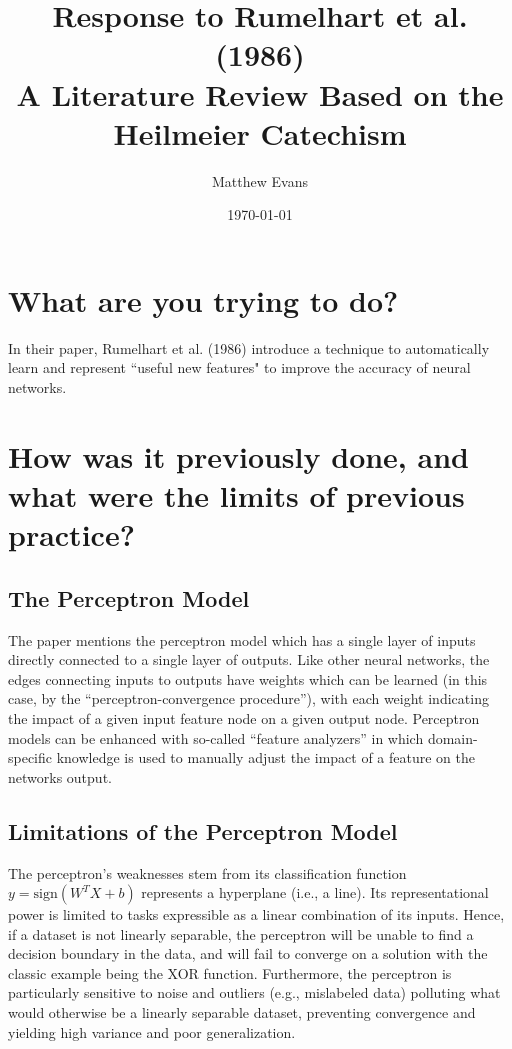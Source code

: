 \documentclass[10pt]{article}
\title{
    Response to Rumelhart et al. (1986) \\
    \large A Literature Review Based on the Heilmeier Catechism
}
\author{Matthew Evans}
\date{\today}
\begin{document}
\maketitle

\section*{What are you trying to do?}

In their paper, Rumelhart et al. (1986) introduce a technique to automatically learn and represent ``useful new features" to improve the accuracy of neural networks.



\section*{How was it previously done, and what were the limits of previous practice?}
\subsection*{The Perceptron Model}


The paper mentions the perceptron model which has a single layer of inputs directly connected to a single layer of outputs. Like other neural networks, the edges connecting inputs to outputs have weights which can be learned (in this case, by the ``perceptron-convergence procedure''), with each weight indicating the impact of a given input feature node on a given output node. Perceptron models can be enhanced with so-called ``feature analyzers'' in which domain-specific knowledge is used to manually adjust the impact of a feature on the networks output.

\subsection*{Limitations of the Perceptron Model}

The perceptron's weaknesses stem from its classification function $y = \text{sign}(W^TX+b)$ represents a hyperplane (i.e., a line). Its representational power is limited to tasks expressible as a linear combination of its inputs. Hence, if a dataset is not linearly separable, the perceptron will be unable to find a decision boundary in the data, and will fail to converge on a solution with the classic example being the XOR function. Furthermore, the perceptron is particularly sensitive to noise and outliers (e.g., mislabeled data) polluting what would otherwise be a linearly separable dataset, preventing convergence and yielding high variance and poor generalization.
\end{document}

